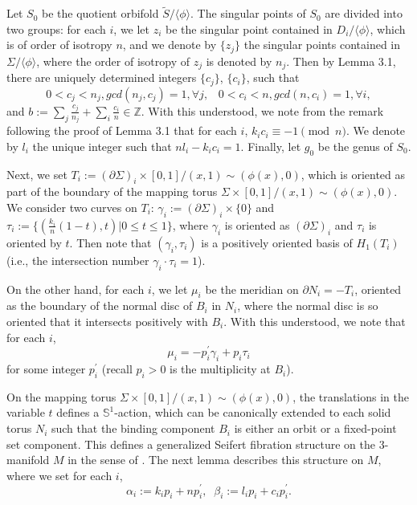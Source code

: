 \documentclass[11pt]{amsart}
\theoremstyle{plain}
\numberwithin{theorem}{section}
\theoremstyle{definition}
\newcommand{\Z}{{\mathbb Z}}
\newcommand{\s}{{\mathbb S}}
\begin{document}
Let $S_0$ be the quotient orbifold $\tilde{S}/\langle \phi\rangle$. The singular points of $S_0$ are divided into two groups: for each $i$, we let $z_i$ be the singular point contained in $D_i/\langle \phi\rangle$, which is of order of isotropy $n$, and we denote by $\{z_j\}$ the singular points contained in $\Sigma/\langle \phi\rangle$, where the order of isotropy of $z_j$ is denoted by $n_j$. Then 
by Lemma 3.1, there are uniquely determined integers $\{c_j\}$, $\{c_i\}$, such that
$$
0<c_j<n_j, gcd(n_j,c_j)=1, \forall j, \;\;\; 0<c_i<n, gcd(n,c_i)=1, \forall i, 
$$
and $b:=\sum_j \frac{c_j}{n_j}+\sum_i \frac{c_i}{n}\in \Z$. With this understood, we note from the remark following the proof of Lemma 3.1 that for each $i$, $k_ic_i\equiv -1 \pmod{n}$. We denote by $l_i$ the unique integer such that $nl_i-k_ic_i=1$. Finally, let $g_0$ be the genus of $S_0$.

Next, we set $T_i:=(\partial \Sigma)_i \times [0,1]/ (x,1)\sim (\phi(x),0)$, which is oriented as part of the boundary of the mapping torus $\Sigma\times [0,1]/ (x,1)\sim (\phi(x),0)$. We consider two 
curves on $T_i$: $\gamma_i:=(\partial \Sigma)_i \times \{0\}$ and 
$\tau_i:=\{(\frac{k_i}{n}(1-t),t)| 0\leq t\leq 1\}$, where $\gamma_i$ is oriented as $(\partial \Sigma)_i$
and $\tau_i$ is oriented by $t$. Then note that $(\gamma_i,\tau_i)$ is a positively oriented basis of
$H_1(T_i)$ (i.e., the intersection number $\gamma_i\cdot \tau_i=1$). 

On the other hand, for each $i$, we let $\mu_i$ be the meridian on
$\partial N_i=-T_i$, oriented as the boundary of the normal disc of $B_i$ in $N_i$, where the normal disc is so oriented that it intersects positively with $B_i$. With this understood, we note that for each $i$, 
$$
\mu_i=-p_i^\prime\gamma_i +p_i\tau_i
$$
for some integer $p_i^\prime$ (recall $p_i>0$ is the multiplicity at $B_i$). 

On the mapping torus $\Sigma\times [0,1]/ (x,1)\sim (\phi(x),0)$, the translations in the variable $t$
defines a $\s^1$-action, which can be canonically extended to each solid torus $N_i$ such that the binding component $B_i$ is either an orbit or a fixed-point set component. This defines 
a generalized Seifert fibration structure on the $3$-manifold $M$ in the sense of \cite{N}. The next lemma describes this structure on $M$, where we set for each $i$, 
$$
\alpha_i:=k_ip_i+np^\prime_i,\;\; \beta_i:=l_ip_i+c_i p^\prime_i.
$$
\end{document}
